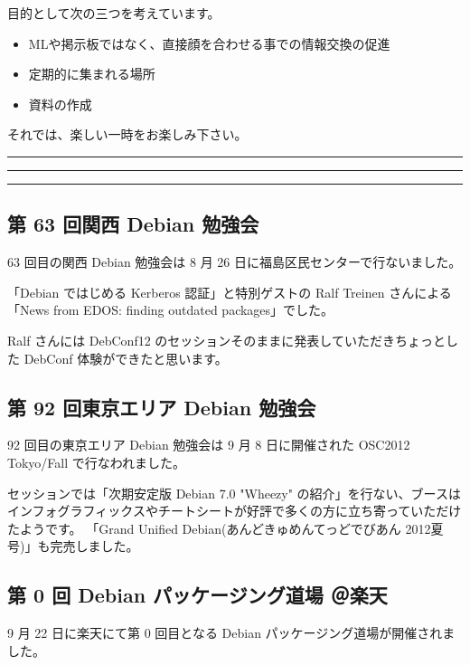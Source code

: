 \documentclass[mingoth,a4paper]{jsarticle}
\begin{document}
 目的として次の三つを考えています。
 \begin{itemize}
  \item MLや掲示板ではなく、直接顔を合わせる事での情報交換の促進
  \item 定期的に集まれる場所
  \item 資料の作成
 \end{itemize}

 それでは、楽しい一時をお楽しみ下さい。

\newpage

\begin{minipage}[b]{0.2\hsize}
 {}
\end{minipage}
\begin{minipage}[b]{0.8\hsize}
\hrule
\vspace{2mm}
\hrule
\setcounter{tocdepth}{1}
\tableofcontents
\vspace{2mm}
\hrule
\end{minipage}


\subsection{第 63 回関西 Debian 勉強会}

63 回目の関西 Debian 勉強会は 8 月 26 日に福島区民センターで行ないました。

「Debian ではじめる Kerberos 認証」と特別ゲストの Ralf Treinen さんによる「News from EDOS: finding outdated packages」でした。

Ralf さんには DebConf12 のセッションそのままに発表していただきちょっとした DebConf 体験ができたと思います。


\subsection{第 92 回東京エリア Debian 勉強会}
92 回目の東京エリア Debian 勉強会は 9 月 8 日に開催された OSC2012 Tokyo/Fall で行なわれました。

セッションでは「次期安定版 Debian 7.0 "Wheezy" の紹介」を行ない、ブースはインフォグラフィックスやチートシートが好評で多くの方に立ち寄っていただけたようです。
「Grand Unified Debian(あんどきゅめんてっどでびあん 2012夏号)」も完売しました。

\subsection{第 0 回 Debian パッケージング道場 ＠楽天}
9 月 22 日に楽天にて第 0 回目となる Debian パッケージング道場が開催されました。
\end{document}
